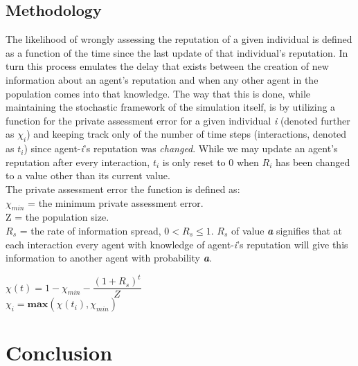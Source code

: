 \documentclass[10pt,a4paper]{article}
\begin{document}
\subsection{Methodology}
The likelihood of wrongly assessing the reputation of a given individual is defined as a function of the time since the last update of that individual's reputation.
In turn this process emulates the delay that exists between the creation of new information about an agent's reputation and when any other agent in the population comes into that knowledge.
The way that this is done, while maintaining the stochastic framework of the simulation itself, is by utilizing a function for the private assessment error for a given individual \textit{i} (denoted further as $\chi_{i}$) and keeping track only of the number of time steps (interactions, denoted as $\textit{t}_{i}$) since agent-\textit{i}'s reputation was \emph{changed}.
While we may update an agent's reputation after every interaction, $\textit{t}_{i}$ is only reset to 0 when $R_{i}$ has been changed to a value other than its current value.
\\
The private assessment error the function is defined as: \\
$\chi_{min}$ = the minimum private assessment error. \\
Z = the population size. \\
$R_{s}$ = the rate of information spread, $0 < R_{s} \leq 1$. 
$R_{s}$ of value \textbf{\textit{a}} signifies that at each interaction every agent with knowledge of agent-\textit{i}'s reputation will give this information to another agent with probability \textbf{\textit{a}}.
\begin{center}
$ \chi(t) = 1 - \chi_{min} - \dfrac{(1 + R_{s})^{t}}{Z}$ \\
$ \chi_{i} = \textbf{max}(\chi(t_{i}), \chi_{min}) $
\end{center}

\section{Conclusion}
\end{document}
